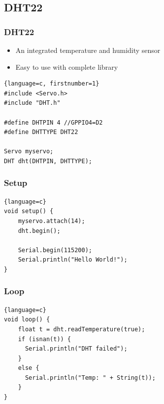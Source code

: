 \documentclass[compress, aspectratio=32]{beamer}
\begin{document}
\subsection{DHT22}
\begin{frame}[fragile]
    \frametitle{DHT22}
    \begin{itemize}
        \item An integrated temperature and humidity sensor
        \item Easy to use with complete library
    \end{itemize}
    \begin{lstlisting}{language=c, firstnumber=1}
#include <Servo.h>
#include "DHT.h"

#define DHTPIN 4 //GPPIO4=D2
#define DHTTYPE DHT22

Servo myservo;
DHT dht(DHTPIN, DHTTYPE);
    \end{lstlisting}
\end{frame}

\begin{frame}[fragile]
    \frametitle{Setup}
    \begin{lstlisting}{language=c}
void setup() {
    myservo.attach(14);
    dht.begin();
    
    Serial.begin(115200);
    Serial.println("Hello World!");
}
    \end{lstlisting}
\end{frame}

\begin{frame}[fragile]
    \frametitle{Loop}
    \begin{lstlisting}{language=c}
void loop() {
    float t = dht.readTemperature(true);
    if (isnan(t)) {
      Serial.println("DHT failed");
    }
    else {
      Serial.println("Temp: " + String(t));
    }
}
    \end{lstlisting}
\end{frame}
\end{document}
